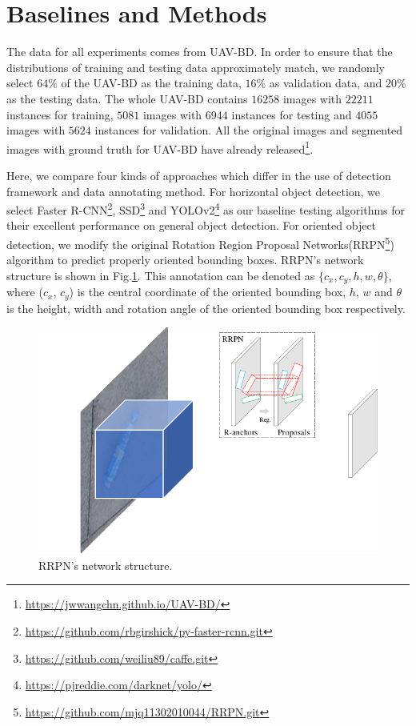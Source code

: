 \section{Baselines and Methods}
\label{sec:exp}


The data for all experiments comes from UAV-BD. In order to ensure that the distributions of training and testing data approximately match, we randomly select $ 64\% $ of the UAV-BD as the training data, $ 16\% $ as validation data, and $ 20\% $ as the testing data. The whole UAV-BD contains $ 16258 $ images with $ 22211 $ instances for training, $ 5081 $ images with $ 6944 $ instances for testing and $ 4055 $ images with $ 5624 $ instances for validation. All the original images and segmented images with ground truth for UAV-BD have already released\footnote{\url{https://jwwangchn.github.io/UAV-BD/}}.

Here, we compare four kinds of approaches which differ in the use of detection framework and data annotating method. For horizontal object detection, we select Faster R-CNN\footnote{\url{https://github.com/rbgirshick/py-faster-rcnn.git}}\cite{FasterRCNN},  SSD\footnote{\url{https://github.com/weiliu89/caffe.git}}\cite{SSD} and YOLOv2\footnote{\url{https://pjreddie.com/darknet/yolo/}}\cite{YOLOv2} as our baseline testing algorithms for their excellent performance on general object detection. For oriented object detection, we modify the original Rotation Region Proposal Networks(RRPN\footnote{\url{https://github.com/mjq11302010044/RRPN.git}}) algorithm\cite{RRPN} to predict properly oriented bounding boxes. RRPN's network structure is shown in Fig.\ref{fig:RRPN}. This annotation can be denoted as $ \{c_x, c_y, h, w, \theta\} $, where ($ c_x $, $ c_y $) is the central coordinate of the oriented bounding box, $ h $, $ w $ and $ \theta $ is the height, width and rotation angle of the oriented bounding box respectively.

\begin{figure}
	\includegraphics[width=\linewidth]{images/RRPN.pdf}
	\caption{RRPN's network structure.}
	\label{fig:RRPN}
\end{figure}

